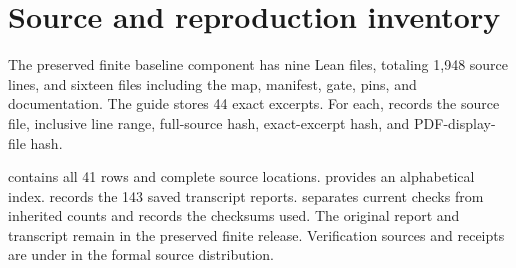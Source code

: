 \section{Source and reproduction inventory}
The preserved finite baseline component has nine Lean files, totaling 1,948 source lines, and sixteen files including the map, manifest, gate, pins, and documentation. The guide stores 44 exact excerpts. For each,  records the source file, inclusive line range, full-source hash, exact-excerpt hash, and PDF-display-file hash.

 contains all 41 rows and complete source locations.  provides an alphabetical index.  records the 143 saved transcript reports.  separates current checks from inherited counts and records the checksums used. The original report and transcript remain in the preserved finite release. Verification sources and receipts are under  in the formal source distribution.


